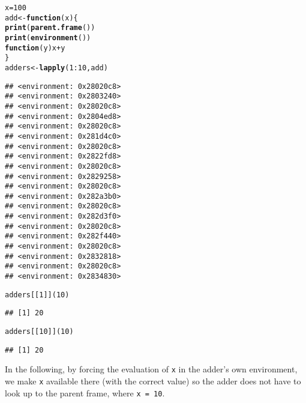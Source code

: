 \documentclass{article}\usepackage[]{graphicx}\usepackage[]{color}
\makeatletter
\newcommand{\hlnum}[1]{\textcolor[rgb]{0.686,0.059,0.569}{#1}}%
\newcommand{\hlopt}[1]{\textcolor[rgb]{0,0,0}{#1}}%
\newcommand{\hlstd}[1]{\textcolor[rgb]{0.345,0.345,0.345}{#1}}%
\newcommand{\hlkwa}[1]{\textcolor[rgb]{0.161,0.373,0.58}{\textbf{#1}}}%
\newcommand{\hlkwb}[1]{\textcolor[rgb]{0.69,0.353,0.396}{#1}}%
\newcommand{\hlkwc}[1]{\textcolor[rgb]{0.333,0.667,0.333}{#1}}%
\newcommand{\hlkwd}[1]{\textcolor[rgb]{0.737,0.353,0.396}{\textbf{#1}}}%
\newenvironment{kframe}{%
 \def\at@end@of@kframe{}%
 \ifinner\ifhmode%
  \def\at@end@of@kframe{\end{minipage}}%
  \begin{minipage}{\columnwidth}%
 \fi\fi%
 \def\FrameCommand##1{\hskip\@totalleftmargin \hskip-\fboxsep
 \colorbox{shadecolor}{##1}\hskip-\fboxsep
     \hskip-\linewidth \hskip-\@totalleftmargin \hskip\columnwidth}%
 \MakeFramed {\advance\hsize-\width
   \@totalleftmargin\z@ \linewidth\hsize
   \@setminipage}}%
 {\par\unskip\endMakeFramed%
 \at@end@of@kframe}
\newenvironment{knitrout}{}{} %
\makeatother
\begin{document}
\begin{knitrout}
\color{fgcolor}\begin{kframe}
\begin{alltt}
\hlstd{x} \hlkwb{=} \hlnum{100}
\hlstd{add} \hlkwb{<-} \hlkwa{function}\hlstd{(}\hlkwc{x}\hlstd{) \{}
  \hlkwd{print}\hlstd{(}\hlkwd{parent.frame}\hlstd{())}
  \hlkwd{print}\hlstd{(}\hlkwd{environment}\hlstd{())}
  \hlkwa{function}\hlstd{(}\hlkwc{y}\hlstd{) x} \hlopt{+} \hlstd{y}
\hlstd{\}}
\hlstd{adders} \hlkwb{<-} \hlkwd{lapply}\hlstd{(}\hlnum{1}\hlopt{:}\hlnum{10}\hlstd{, add)}
\end{alltt}
\begin{verbatim}
## <environment: 0x28020c8>
## <environment: 0x2803240>
## <environment: 0x28020c8>
## <environment: 0x2804ed8>
## <environment: 0x28020c8>
## <environment: 0x281d4c0>
## <environment: 0x28020c8>
## <environment: 0x2822fd8>
## <environment: 0x28020c8>
## <environment: 0x2829258>
## <environment: 0x28020c8>
## <environment: 0x282a3b0>
## <environment: 0x28020c8>
## <environment: 0x282d3f0>
## <environment: 0x28020c8>
## <environment: 0x282f440>
## <environment: 0x28020c8>
## <environment: 0x2832818>
## <environment: 0x28020c8>
## <environment: 0x2834830>
\end{verbatim}
\begin{alltt}
\hlstd{adders[[}\hlnum{1}\hlstd{]](}\hlnum{10}\hlstd{)}
\end{alltt}
\begin{verbatim}
## [1] 20
\end{verbatim}
\begin{alltt}
\hlstd{adders[[}\hlnum{10}\hlstd{]](}\hlnum{10}\hlstd{)}
\end{alltt}
\begin{verbatim}
## [1] 20
\end{verbatim}
\end{kframe}
\end{knitrout}

In the following, by forcing the evaluation of \verb`x` in the adder's own environment, we make \verb`x` available there (with the correct value) so the adder does not have to look up to the parent frame, where \verb`x = 10`.
\end{document}
